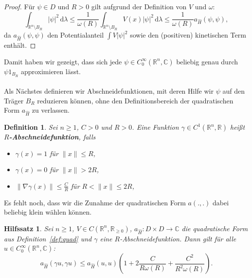 \documentclass[11pt,a4paper,leqno]{report}
\newtheorem{lemma}[theorem]{Hilfssatz}
\newtheorem{definition}[theorem]{Definition}
\numberwithin{equation}{chapter}
\begin{document}
\begin{proof}
	Für $\psi \in D$ und $R > 0$ gilt aufgrund der Definition von $V$ und $\omega$:
	\[
	\int_{\mathbb{R}^n \setminus B_R} |\psi|^2 \, \mathrm{d}\lambda \le \frac{1}{\omega(R)} \int_{\mathbb{R}^n \setminus B_R} V(x) |\psi|^2 \, \mathrm{d}\lambda \le \frac{1}{\omega(R)} a_{\hat{H}}(\psi, \psi),
	\]
	da $a_{\hat{H}}(\psi, \psi)$ den Potentialanteil $\int V |\psi|^2$ sowie den (positiven) kinetischen Term enthält.
\end{proof}
\noindent
Damit haben wir gezeigt, dass sich jede $\psi \in C^\infty_0(\mathbb{R}^n, \mathbb{C})$ beliebig genau durch $\psi 1_{B_R}$ approximieren lässt.\\
\\
Als Nächstes definieren wir Abschneidefunktionen, mit deren Hilfe wir $\psi$ auf den Träger $B_R$ reduzieren können, ohne den Definitionsbereich der quadratischen Form $a_{\hat{H}}$ zu verlassen.
\begin{definition}\label{def:abschneide}
	Sei $n \ge 1$, $C>0$ und $R > 0$. Eine Funktion $\gamma \in C^1(\mathbb{R}^n, \mathbb{R})$ heißt \textbf{$R$-Abschneidefunktion}, falls
	\begin{itemize}
		\item $\gamma(x) = 1$ für $\|x\| \le R$,
		\item $\gamma(x) = 0$ für $\|x\| > 2R$,
		\item $\|\nabla \gamma(x)\| \le \frac{C}{R}$ für $R < \|x\| \le 2R$,
	\end{itemize}
\end{definition}
\noindent
Es fehlt noch, dass wir die Zunahme der quadratischen Form $a(.,.)$ dabei beliebig klein wählen können.
\begin{lemma}\label{lem:cutoff-estimate}
	Sei $n \ge 1$, $V \in C(\mathbb{R}^n, \mathbb{R}_{\geq 0})$, $a_{\hat{H}}: D \times D \to \mathbb{C}$ die quadratische Form aus Definition~\ref{def:quad} und $\gamma$ eine $R$-Abschneidefunktion. Dann gilt für alle $u \in C^\infty_0(\mathbb{R}^n, \mathbb{C})$:
	\begin{equation}\label{eq:cutoff-est}
		a_{\hat{H}}(\gamma u, \gamma u) \le a_{\hat{H}}(u,u) \left( 1 + 2\frac{C}{R\omega(R)} + \frac{C^2}{R^2\omega(R)} \right).
	\end{equation}
\end{lemma}
\end{document}
